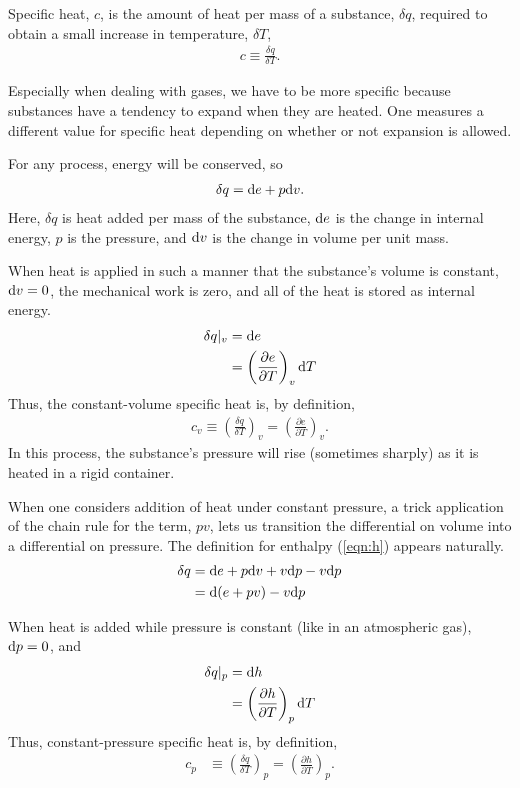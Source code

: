 Specific heat, $c$, is the amount of heat per mass of a substance, $\delta q$, required to obtain a small increase in temperature, $\delta T$,
\begin{align}
c \equiv \frac{\delta q}{\delta T}.
\end{align}

Especially when dealing with gases, we have to be more specific because substances have a tendency to expand when they are heated.  One measures a different value for specific heat depending on whether or not expansion is allowed. 

For any process, energy will be conserved, so
\begin{align}
\delta q = \mathrm{d} e + p\mathrm{d} v.
\end{align}
Here, $\delta q$ is heat added per mass of the substance, $\mathrm{d} e$ is the change in internal energy, $p$ is the pressure, and $\mathrm{d} v$ is the change in volume per unit mass.

When heat is applied in such a manner that the substance's volume is constant, $\mathrm{d} v = 0$, the mechanical work is zero, and all of the heat is stored as internal energy.
\begin{align}
\delta q |_v &= \mathrm{d} e\nonumber\\
 &= \left(\frac{\partial e}{\partial T}\right)_v \mathrm{d} T
\end{align}
Thus, the constant-volume specific heat is, by definition, 
\begin{align}
c_v \equiv \left(\frac{\delta q}{\delta T}\right)_v = \left(\frac{\partial e}{\partial T}\right)_v.\label{eqn:cv}
\end{align}
In this process, the substance's pressure will rise (sometimes sharply) as it is heated in a rigid container.

When one considers addition of heat under constant pressure, a trick application of the chain rule for the term, $pv$, lets us transition the differential on volume into a differential on pressure.  The definition for enthalpy (\ref{eqn:h}) appears naturally.
\begin{align}
\delta q &= \mathrm{d} e + p \mathrm{d} v + v\mathrm{d} p - v \mathrm{d} p\nonumber\\
 &= \mathrm{d}(e + pv) - v\mathrm{d} p
\end{align}

When heat is added while pressure is constant (like in an atmospheric gas), $\mathrm{d} p=0$, and 
\begin{align}
\delta q |_p &= \mathrm{d} h\nonumber\\
 &= \left( \frac{\partial h}{\partial T}\right)_p \mathrm{d} T
\end{align}
Thus, constant-pressure specific heat is, by definition,
\begin{align}
c_p &\equiv \left(\frac{\delta q}{\delta T}\right)_p = \left( \frac{\partial h}{\partial T}\right)_p.\label{eqn:cp}
\end{align}



%
% 
%
